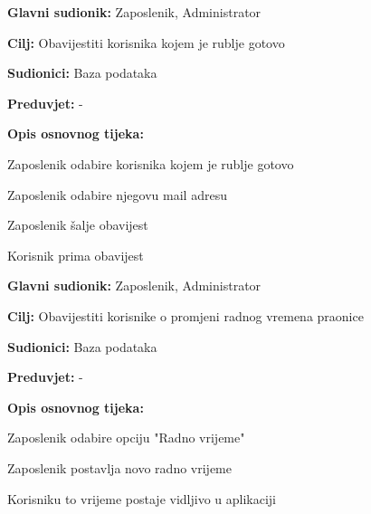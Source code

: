 \begin{packed_item}
	
	\item \textbf{Glavni sudionik: }Zaposlenik, Administrator
	\item  \textbf{Cilj:} Obavijestiti korisnika kojem je rublje gotovo
	\item  \textbf{Sudionici:} Baza podataka
	\item  \textbf{Preduvjet:} -
	\item  \textbf{Opis osnovnog tijeka:}
	
	\item[] \begin{packed_enum}
		
		\item Zaposlenik odabire korisnika kojem je rublje gotovo
		\item Zaposlenik odabire njegovu mail adresu 
		\item Zaposlenik šalje obavijest
		\item Korisnik prima obavijest
		
	\end{packed_enum}
	
\end{packed_item}
\noindent {}
\begin{packed_item}
	
	\item \textbf{Glavni sudionik: }Zaposlenik, Administrator
	\item  \textbf{Cilj:} Obavijestiti korisnike o promjeni radnog vremena praonice 
	\item  \textbf{Sudionici:} Baza podataka
	\item  \textbf{Preduvjet:} -
	\item  \textbf{Opis osnovnog tijeka:}
	
	\item[] \begin{packed_enum}
		
		\item Zaposlenik odabire opciju "Radno vrijeme"
		\item Zaposlenik postavlja novo radno vrijeme
		\item Korisniku to vrijeme postaje vidljivo u aplikaciji
		
	\end{packed_enum}
	
\end{packed_item}
\noindent {}
